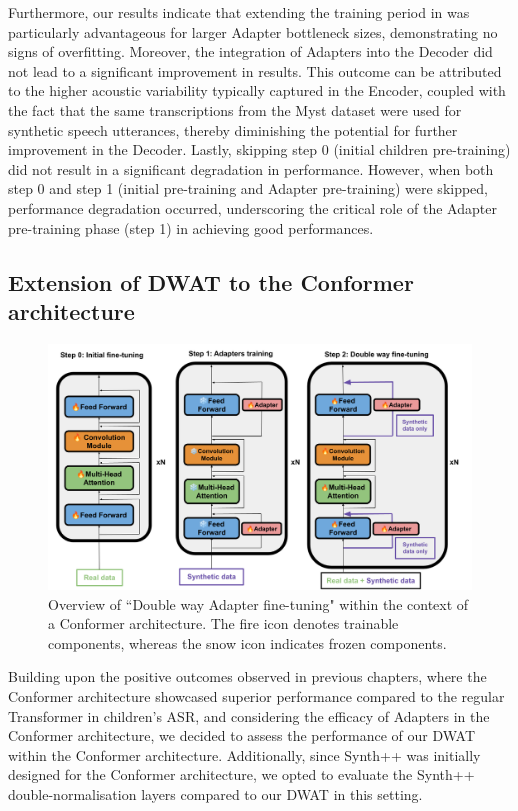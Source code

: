 Furthermore, our results indicate that extending the training period in was particularly advantageous for larger Adapter bottleneck sizes, demonstrating no signs of overfitting. Moreover, the integration of Adapters into the Decoder did not lead to a significant improvement in results. This outcome can be attributed to the higher acoustic variability typically captured in the Encoder, coupled with the fact that the same transcriptions from the Myst dataset were used for synthetic speech utterances, thereby diminishing the potential for further improvement in the Decoder. Lastly, skipping step 0 (initial children pre-training) did not result in a significant degradation in performance. However, when both step 0 and step 1 (initial pre-training and Adapter pre-training) were skipped, performance degradation occurred, underscoring the critical role of the Adapter pre-training phase (step 1) in achieving good performances.

\subsection{Extension of DWAT to the Conformer architecture}
\begin{figure}
    \centering
    \includegraphics[width=\textwidth]{imgs/Overall_system.png}
    \caption{Overview of ``Double way Adapter fine-tuning"  within the context of a Conformer architecture. The fire icon denotes trainable components, whereas the snow icon indicates frozen components.}
    \label{fig:TTS_conformer}
\end{figure}

Building upon the positive outcomes observed in previous chapters, where the Conformer architecture showcased superior performance compared to the regular Transformer in children's \ac{ASR}, and considering the efficacy of Adapters in the Conformer architecture, we decided to assess the performance of our \ac{DWAT} within the Conformer architecture. Additionally, since Synth++ \cite{hu2022synt++} was initially designed for the Conformer architecture, we opted to evaluate the Synth++ double-normalisation layers compared to our \ac{DWAT} in this setting. 

